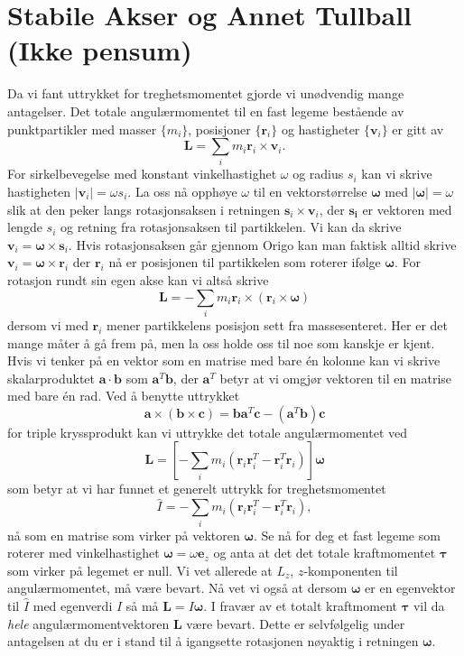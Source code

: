 \documentclass[twoside,utf8]{article}
\begin{document}
\section{Stabile Akser og Annet Tullball (Ikke pensum)}
Da vi fant uttrykket for treghetsmomentet gjorde vi unødvendig mange antagelser. Det totale angulærmomentet til en fast legeme bestående av punktpartikler med masser $\{m_i\}$, posisjoner $\{\mathbf{r}_i\}$ og hastigheter $\{\mathbf{v}_i\}$ er gitt av
\[
  \mathbf{L} = \sum_i m_i \mathbf{r}_i \times \mathbf{v}_i.
\]
For sirkelbevegelse med konstant vinkelhastighet $\omega$ og radius $s_i$ kan vi skrive hastigheten $|\mathbf{v}_i|=\omega s_i$. La oss nå opphøye $\omega$ til en vektorstørrelse $\pmb{\omega}$ med $|\pmb{\omega}|=\omega$ slik at den peker langs rotasjonsaksen i retningen $\mathbf{s}_i \times \mathbf{v}_i$, der $\mathbf{s_i}$ er vektoren med lengde $s_i$ og retning fra rotasjonsaksen til partikkelen.
Vi kan da skrive $\mathbf{v}_i = \pmb{\omega}\times \mathbf{s}_i$. Hvis rotasjonsaksen går gjennom Origo kan man faktisk alltid skrive $\mathbf{v}_i=\pmb{\omega}\times \mathbf{r}_i$ der $\mathbf{r}_i$ nå er posisjonen til partikkelen som roterer ifølge $\pmb{\omega}$. For rotasjon rundt sin egen akse kan vi altså skrive
\[
  \mathbf{L} = -\sum_i m_i \mathbf{r}_i \times (\mathbf{r}_i  \times \pmb{\omega})
\]
dersom vi med $\mathbf{r}_i$ mener partikkelens posisjon sett fra massesenteret. Her er det mange måter å gå frem på, men la oss holde oss til noe som kanskje er kjent. Hvis vi tenker på en vektor som en matrise med bare én kolonne kan vi skrive skalarproduktet $\mathbf{a}\cdot \mathbf{b}$ som $\mathbf{a}^T \mathbf{b}$, der $\mathbf{a}^T$ betyr at vi omgjør vektoren til en matrise med bare én rad. Ved å benytte uttrykket
\[
  \mathbf{a}\times (\mathbf{b}\times \mathbf{c}) = \mathbf{b} \mathbf{a}^T \mathbf{c}- (\mathbf{a}^T \mathbf{b}) \mathbf{c}
\]
for triple kryssprodukt kan vi uttrykke det totale angulærmomentet ved
\[
  \mathbf{L} = \left[-\sum_i m_i (\mathbf{r}_i \mathbf{r}_i^T-\mathbf{r}_i^T \mathbf{r}_i)\right]\pmb{\omega}
\]
som betyr at vi har funnet et generelt uttrykk for treghetsmomentet
\[
  \hat{I} = -\sum_i m_i (\mathbf{r}_i \mathbf{r}_i^T-\mathbf{r}_i^T \mathbf{r}_i),
\]
nå som en matrise som virker på vektoren $\pmb{\omega}$. Se nå for deg et fast legeme som roterer med vinkelhastighet $\pmb{\omega}=\omega \mathbf{e}_z$ og anta at det det totale kraftmomentet $\pmb{\tau}$ som virker på legemet er null. Vi vet allerede at $L_z$, $z$-komponenten til angulærmomentet, må være bevart. Nå vet vi også at dersom $\pmb{\omega}$ er en egenvektor til $\hat{I}$ med egenverdi $I$ så må $\mathbf{L}=I\pmb{\omega}$.
I fravær av et totalt kraftmoment $\pmb{\tau}$ vil da \textit{hele} angulærmomentvektoren $\mathbf{L}$ være bevart. Dette er selvfølgelig under antagelsen at du er i stand til å igangsette rotasjonen nøyaktig i retningen $\pmb{\omega}$.
\end{document}
